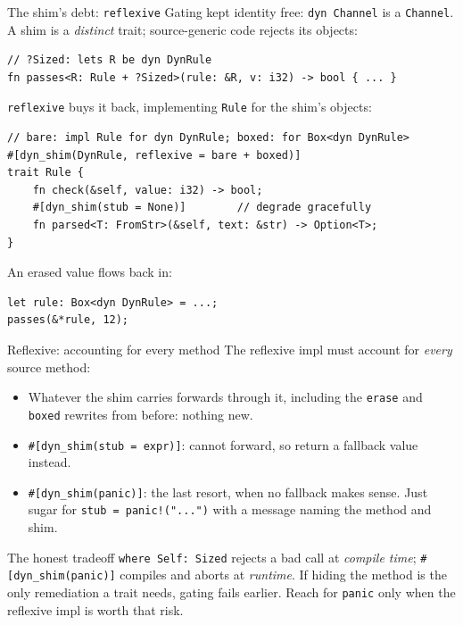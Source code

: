 \documentclass[aspectratio=169]{beamer}
\begin{document}
\begin{frame}[fragile]{The shim's debt: \texttt{reflexive}}
  Gating kept identity free: \texttt{dyn Channel} is a \texttt{Channel}.
  A shim is a \emph{distinct} trait; source-generic code rejects its objects:
\begin{lstlisting}
// ?Sized: lets R be dyn DynRule
fn passes<R: Rule + ?Sized>(rule: &R, v: i32) -> bool { ... }
\end{lstlisting}
\pause
  \texttt{reflexive} buys it back, implementing \texttt{Rule} for the shim's
  objects:
\begin{lstlisting}
// bare: impl Rule for dyn DynRule; boxed: for Box<dyn DynRule>
#[dyn_shim(DynRule, reflexive = bare + boxed)]
trait Rule {
    fn check(&self, value: i32) -> bool;
    #[dyn_shim(stub = None)]        // degrade gracefully
    fn parsed<T: FromStr>(&self, text: &str) -> Option<T>;
}
\end{lstlisting}
\pause
  An erased value flows back in:
\begin{lstlisting}
let rule: Box<dyn DynRule> = ...;
passes(&*rule, 12);
\end{lstlisting}
\end{frame}

\begin{frame}{Reflexive: accounting for every method}
  The reflexive impl must account for \emph{every} source method:
  \begin{itemize}
    \item Whatever the shim carries forwards through it, including the
          \texttt{erase} and \texttt{boxed} rewrites from before: nothing new.
    \item \texttt{\#[dyn\_shim(stub = expr)]}: cannot forward, so return a
          fallback value instead.
    \item \texttt{\#[dyn\_shim(panic)]}: the last resort, when no fallback
          makes sense. Just sugar for \texttt{stub = panic!("...")} with a
          message naming the method and shim.
  \end{itemize}
  \begin{alertblock}{The honest tradeoff}
    \texttt{where Self: Sized} rejects a bad call at \emph{compile time};
    \texttt{\#[dyn\_shim(panic)]} compiles and aborts at \emph{runtime}.
    If hiding the method is the only remediation a trait needs, gating
    fails earlier. Reach for \texttt{panic} only when the reflexive impl
    is worth that risk.
  \end{alertblock}
\end{frame}
\end{document}
